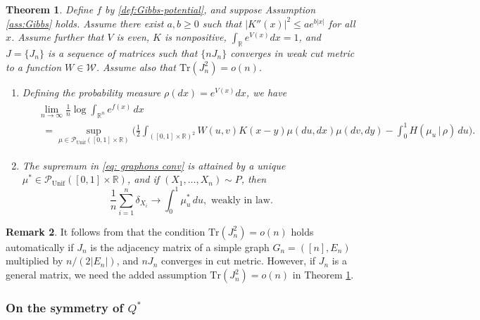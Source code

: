 \documentclass[11pt,reqno]{amsart}
\numberwithin{equation}{section}
\newtheorem{theorem}{Theorem}[section]
\theoremstyle{definition}
\newtheorem{remark}[theorem]{Remark}
\def\R{{\mathbb R}}
\def\P{{\mathcal P}}
\def\tr{{\mathrm{Tr}}}
\def\Punif{\P_{\mathrm{Unif}}([0,1] \times \R)}
\begin{document}
\begin{theorem}\label{thm:graphons}
	Define $f$ by \eqref{def:Gibbs-potential}, and suppose Assumption \ref{ass:Gibbs} holds.
		Assume there exist $a,b \ge 0$ such that $|K''(x)|^2 \le ae^{b|x|}$ for all $x$.
		Assume further that $V$ is even, $K$ is nonpositive, $\int_{\R} e^{V(x)}dx=1$, and $J=\{J_n\}$ is a sequence of matrices such that $\{nJ_n\}$ converges in weak cut metric to a function $W\in \mathcal{W}$. Assume also that $\tr(J_n^2) = o(n)$.

	\begin{enumerate}[(1)]
		\item \label{graphons conv} Defining the probability measure $\rho(dx)=e^{V(x)}dx$, we have
		\begin{align}
			\begin{split}
				&\lim_{n\to\infty}\frac{1}{n}\log \int_{\R^n} e^{f(x)}\,dx \\
				& \ \ = \sup_{\mu \in \Punif} \bigg( \frac12 \int_{([0,1] \times \R)^2}  \!\! W(u,v)K(x-y)\mu(du,dx)\mu(dv,dy) - \int_0^1 \!\!H(\mu_u\,|\,\rho)\,du\bigg). \label{eq: graphons conv}
			\end{split}
		\end{align}
		\item \label{graphons weak law} The supremum in \eqref{eq: graphons conv} is attained by a unique $\mu^* \in \Punif$, and if $(X_1,\ldots,X_n) \sim P$, then
		\begin{equation}
			\frac{1}{n}\sum_{i=1}^n\delta_{X_i} \to \int_0^1\mu^*_u \,du, \text{ weakly in law}. \label{eq: graphons weak law}
		\end{equation}
	\end{enumerate}
\end{theorem}


\begin{remark}
It follows from \cite[Propositions C.5 and C.15]{borgs-Lp-1} that the condition $\tr(J_n^2)=o(n)$ holds automatically if $J_n$ is the adjacency matrix of a simple graph $G_n=([n],E_n)$ multiplied by $n/(2|E_n|)$, and $nJ_n$ converges in cut metric. 
However, if $J_n$ is a general matrix, we need the added assumption $\tr(J_n^2)=o(n)$ in Theorem \ref{thm:graphons}.
\end{remark}



\subsubsection{On the symmetry of $Q^*$} \label{se:symmetry}
\end{document}

